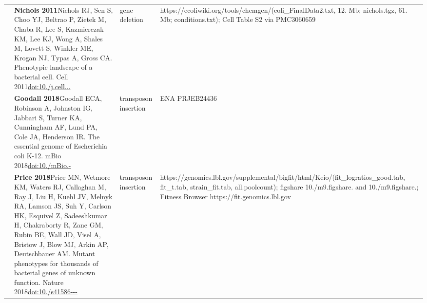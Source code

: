 \begin{landscape}
\begin{longtable}{@{}r@{\hspace{4pt}} L{86mm} L{74mm} L{78mm}@{}}
 & \textbf{Nichols 2011}\newline Nichols RJ, Sen S, Choo YJ, Beltrao P, Zietek M, Chaba R, Lee S, Kazmierczak KM, Lee KJ, Wong A, Shales M, Lovett S, Winkler ME, Krogan NJ, Typas A, Gross CA. Phenotypic landscape of a bacterial cell. Cell 2011\newline \href{https://doi.org/10.1016/j.cell.2010.11.052}{doi:10./\allowbreak j.\allowbreak cell...} & gene deletion & https:/\allowbreak /\allowbreak ecoliwiki.\allowbreak org/\allowbreak tools/\allowbreak chemgen/\allowbreak  (coli\_\allowbreak FinalData2.\allowbreak txt, 12. Mb; nichols.\allowbreak tgz, 61. Mb; conditions.\allowbreak txt); Cell Table S2 via PMC3060659 \\
 & \textbf{Goodall 2018}\newline Goodall ECA, Robinson A, Johnston IG, Jabbari S, Turner KA, Cunningham AF, Lund PA, Cole JA, Henderson IR. The essential genome of Escherichia coli K-12. mBio 2018\newline \href{https://doi.org/10.1128/mBio.02096-17}{doi:10./\allowbreak mBio.-} & transposon insertion & ENA PRJEB24436 \\
 & \textbf{Price 2018}\newline Price MN, Wetmore KM, Waters RJ, Callaghan M, Ray J, Liu H, Kuehl JV, Melnyk RA, Lamson JS, Suh Y, Carlson HK, Esquivel Z, Sadeeshkumar H, Chakraborty R, Zane GM, Rubin BE, Wall JD, Visel A, Bristow J, Blow MJ, Arkin AP, Deutschbauer AM. Mutant phenotypes for thousands of bacterial genes of unknown function. Nature 2018\newline \href{https://doi.org/10.1038/s41586-018-0124-0}{doi:10./\allowbreak s41586---} & transposon insertion & https:/\allowbreak /\allowbreak genomics.\allowbreak lbl.\allowbreak gov/\allowbreak supplemental/\allowbreak bigfit/\allowbreak html/\allowbreak Keio/\allowbreak  (fit\_\allowbreak logratios\_\allowbreak good.\allowbreak tab, fit\_\allowbreak t.\allowbreak tab, strain\_\allowbreak fit.\allowbreak tab, all.\allowbreak poolcount); figshare 10./\allowbreak m9.\allowbreak figshare. and 10./\allowbreak m9.\allowbreak figshare.; Fitness Browser https:/\allowbreak /\allowbreak fit.\allowbreak genomics.\allowbreak lbl.\allowbreak gov \\

\end{longtable}
\end{landscape}
